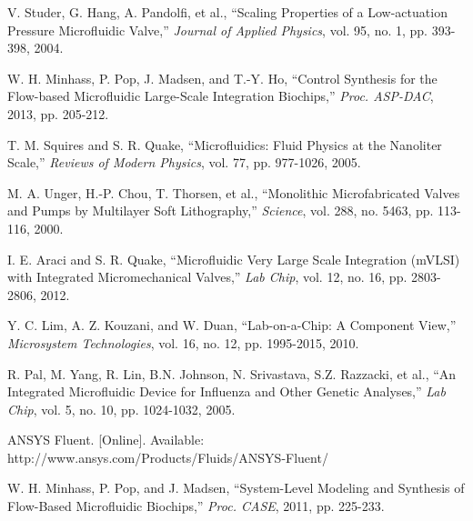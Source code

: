 \documentclass[journal]{IEEEtran}
\begin{document}
\begin{thebibliography}{99}
{%

V. Studer, G. Hang, A. Pandolfi, et al., %
``Scaling Properties of a Low-actuation Pressure Microfluidic Valve,'' 
{\em Journal of Applied Physics}, 
vol. 95, no. 1, pp. 393-398, 2004.

W. H. Minhass, P. Pop, J. Madsen, and T.-Y. Ho, 
``Control Synthesis for the Flow-based Microfluidic Large-Scale Integration Biochips,''
{\em Proc. ASP-DAC}, 
2013, pp. 205-212.

T. M. Squires and S. R. Quake, 
``Microfluidics: Fluid Physics at the Nanoliter Scale,'' 
{\em Reviews of Modern Physics}, 
vol. 77, pp. 977-1026, 2005.

M. A. Unger, H.-P. Chou, T. Thorsen, et al., %
``Monolithic Microfabricated Valves and Pumps by Multilayer Soft Lithography,''
{\em Science}, 
vol. 288, no. 5463, pp. 113-116, 2000.

I. E. Araci and S. R. Quake, 
``Microfluidic Very Large Scale Integration (mVLSI) with Integrated Micromechanical Valves,''
{\em Lab Chip}, 
vol. 12, no. 16, pp. 2803-2806, 2012.


Y. C. Lim, A. Z. Kouzani, and W. Duan, 
``Lab-on-a-Chip: A Component View,'' 
{\em Microsystem Technologies},
vol. 16, no. 12, pp. 1995-2015, 2010.

R. Pal, M. Yang, R. Lin, B.N. Johnson, N. Srivastava, S.Z. Razzacki, et al., 
``An Integrated Microfluidic Device for Influenza and Other Genetic Analyses,''
{\em Lab Chip}, 
vol. 5, no. 10, pp. 1024-1032, 2005.

ANSYS Fluent. [Online]. Available: http://www.ansys.com/Products/Fluids/ANSYS-Fluent/

W. H. Minhass, P. Pop, and J. Madsen, 
``System-Level Modeling and Synthesis of Flow-Based Microfluidic Biochips,''
{\em Proc. CASE}, 
2011, pp. 225-233.

}
\end{thebibliography}
\end{document}
